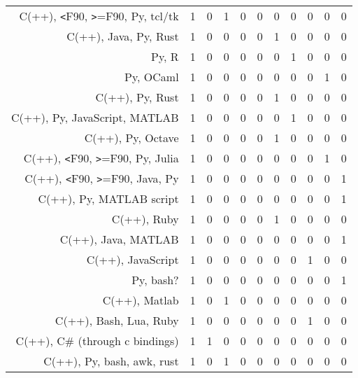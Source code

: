{\begin{landscape}
\begin{longtable}[htb]{r|c|c|c|c|c|c|c|c|c|c}
{C(++), \verb!<!F90, \verb!>!=F90, Py, tcl/tk} & 1 & 0 & 1 & 0 & 0 & 0 & 0 & 0 & 0 & 0 \\%
{C(++), Java, Py, Rust} & 1 & 0 & 0 & 0 & 0 & 1 & 0 & 0 & 0 & 0 \\%
{Py, R} & 1 & 0 & 0 & 0 & 0 & 0 & 1 & 0 & 0 & 0 \\%
{Py, OCaml} & 1 & 0 & 0 & 0 & 0 & 0 & 0 & 0 & 1 & 0 \\%
{C(++), Py, Rust} & 1 & 0 & 0 & 0 & 0 & 1 & 0 & 0 & 0 & 0 \\%
{C(++), Py, JavaScript, MATLAB} & 1 & 0 & 0 & 0 & 0 & 0 & 1 & 0 & 0 & 0 \\%
{C(++), Py, Octave} & 1 & 0 & 0 & 0 & 0 & 1 & 0 & 0 & 0 & 0 \\%
{C(++), \verb!<!F90, \verb!>!=F90, Py, Julia} & 1 & 0 & 0 & 0 & 0 & 0 & 0 & 0 & 1 & 0 \\%
{C(++), \verb!<!F90, \verb!>!=F90, Java, Py} & 1 & 0 & 0 & 0 & 0 & 0 & 0 & 0 & 0 & 1 \\%
{C(++), Py, MATLAB script} & 1 & 0 & 0 & 0 & 0 & 0 & 0 & 0 & 0 & 1 \\%
{C(++), Ruby} & 1 & 0 & 0 & 0 & 0 & 1 & 0 & 0 & 0 & 0 \\%
{C(++), Java, MATLAB} & 1 & 0 & 0 & 0 & 0 & 0 & 0 & 0 & 0 & 1 \\%
{C(++), JavaScript} & 1 & 0 & 0 & 0 & 0 & 0 & 0 & 1 & 0 & 0 \\%
{Py, bash?} & 1 & 0 & 0 & 0 & 0 & 0 & 0 & 0 & 0 & 1 \\%
{C(++), Matlab} & 1 & 0 & 1 & 0 & 0 & 0 & 0 & 0 & 0 & 0 \\%
{C(++), Bash, Lua, Ruby} & 1 & 0 & 0 & 0 & 0 & 0 & 0 & 1 & 0 & 0 \\%
{C(++), C\# (through c bindings)} & 1 & 1 & 0 & 0 & 0 & 0 & 0 & 0 & 0 & 0 \\%
{C(++), Py, bash, awk, rust} & 1 & 0 & 1 & 0 & 0 & 0 & 0 & 0 & 0 & 0 \\%
\hline%
\end{longtable}%
\end{landscape}}%
\clearpage%
